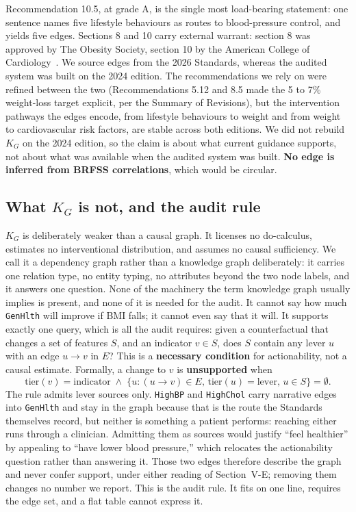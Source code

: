 \documentclass[conference]{IEEEtran}
\begin{document}
Recommendation 10.5, at grade A, is the single most load-bearing statement: one sentence names five lifestyle behaviours as routes to blood-pressure control, and yields five edges. Sections 8 and 10 carry external warrant: section 8 was approved by The Obesity Society, section 10 by the American College of Cardiology~\cite{ada2026int}. We source edges from the 2026 Standards, whereas the audited system was built on the 2024 edition. The recommendations we rely on were refined between the two (Recommendations 5.12 and 8.5 made the 5 to 7\% weight-loss target explicit, per the Summary of Revisions), but the intervention pathways the edges encode, from lifestyle behaviours to weight and from weight to cardiovascular risk factors, are stable across both editions. We did not rebuild $K_G$ on the 2024 edition, so the claim is about what current guidance supports, not about what was available when the audited system was built. \textbf{No edge is inferred from BRFSS correlations}, which would be circular.

\subsection{What $K_G$ is not, and the audit rule}
$K_G$ is deliberately weaker than a causal graph. It licenses no do-calculus, estimates no interventional distribution, and assumes no causal sufficiency. We call it a dependency graph rather than a knowledge graph deliberately: it carries one relation type, no entity typing, no attributes beyond the two node labels, and it answers one question. None of the machinery the term knowledge graph usually implies is present, and none of it is needed for the audit. It cannot say how much \texttt{GenHlth} will improve if BMI falls; it cannot even say that it will. It supports exactly one query, which is all the audit requires: given a counterfactual that changes a set of features $S$, and an indicator $v \in S$, does $S$ contain any lever $u$ with an edge $u \rightarrow v$ in $E$? This is a \textbf{necessary condition} for actionability, not a causal estimate. Formally, a change to $v$ is \textbf{unsupported} when
\begin{equation}
\mathrm{tier}(v){=}\mathrm{indicator} \;\wedge\; \{u : (u{\rightarrow}v){\in}E,\, \mathrm{tier}(u){=}\mathrm{lever},\, u{\in}S\} {=} \emptyset .
\end{equation}
The rule admits lever sources only. \texttt{HighBP} and \texttt{HighChol} carry narrative edges into \texttt{GenHlth} and stay in the graph because that is the route the Standards themselves record, but neither is something a patient performs: reaching either runs through a clinician. Admitting them as sources would justify ``feel healthier'' by appealing to ``have lower blood pressure,'' which relocates the actionability question rather than answering it. Those two edges therefore describe the graph and never confer support, under either reading of Section~V-E; removing them changes no number we report. This is the audit rule. It fits on one line, requires the edge set, and a flat table cannot express it.
\end{document}
